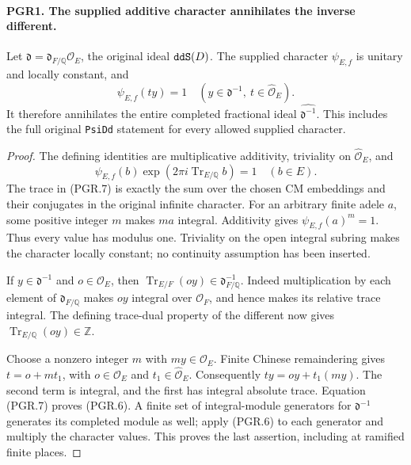 \documentclass[11pt,a4paper]{article}
\numberwithin{equation}{section}
\theoremstyle{remark}\newtheorem{remark}[theorem]{Remark}
\begin{document}
\paragraph{PGR1. The supplied additive character annihilates the inverse different.}
\label{claim:PGR1}
Let \(\mathfrak d=\mathfrak d_{F/\mathbb Q}\mathcal O_E\), the
original ideal \(\texttt{dd\allowbreak S}(D)\).  The supplied character
\(\psi_{E,f}\) is unitary and locally constant, and
\[
       \psi_{E,f}(t y)=1
       \quad(y\in\mathfrak d^{-1},\ t\in\widehat{\mathcal O}_E).
\tag{PGR.6}
\]
It therefore annihilates the entire completed fractional ideal
\(\widehat{\mathfrak d^{-1}}\).  This includes the full original
\texttt{Psi\allowbreak Dd} statement for every allowed supplied character.
\begin{proof}
The defining identities are multiplicative additivity, triviality on
\(\widehat{\mathcal O}_E\), and
\[
 \psi_{E,f}(b)\exp(2\pi i\operatorname{Tr}_{E/\mathbb Q}b)=1
                         \quad(b\in E).
\tag{PGR.7}
\]
The trace in (PGR.7) is exactly the sum over the chosen CM embeddings
and their conjugates in the original infinite character.  For an
arbitrary finite adele \(a\), some positive integer \(m\) makes
\(ma\) integral.  Additivity gives \(\psi_{E,f}(a)^m=1\).
Thus every value has modulus one.  Triviality on the open integral
subring makes the character locally constant; no continuity assumption
has been inserted.

If \(y\in\mathfrak d^{-1}\) and \(o\in\mathcal O_E\), then
\(\operatorname{Tr}_{E/F}(oy)\in\mathfrak d_{F/\mathbb Q}^{-1}\).
Indeed multiplication by each element of \(\mathfrak d_{F/\mathbb Q}\)
makes \(oy\) integral over \(\mathcal O_F\), and hence makes its
relative trace integral.  The defining trace-dual property of the
different now gives
\(\operatorname{Tr}_{E/\mathbb Q}(oy)\in\mathbb Z\).

Choose a nonzero integer \(m\) with \(my\in\mathcal O_E\).
Finite Chinese remaindering gives
\(t=o+mt_1\), with \(o\in\mathcal O_E\) and
\(t_1\in\widehat{\mathcal O}_E\).  Consequently
\(ty=oy+t_1(my)\).  The second term is integral, and the first
has integral absolute trace.  Equation (PGR.7) proves (PGR.6).
A finite set of integral-module generators for
\(\mathfrak d^{-1}\) generates its completed module as well;
apply (PGR.6) to each generator and multiply the character values.
This proves the last assertion, including at ramified finite places.
\end{proof}

\end{document}
